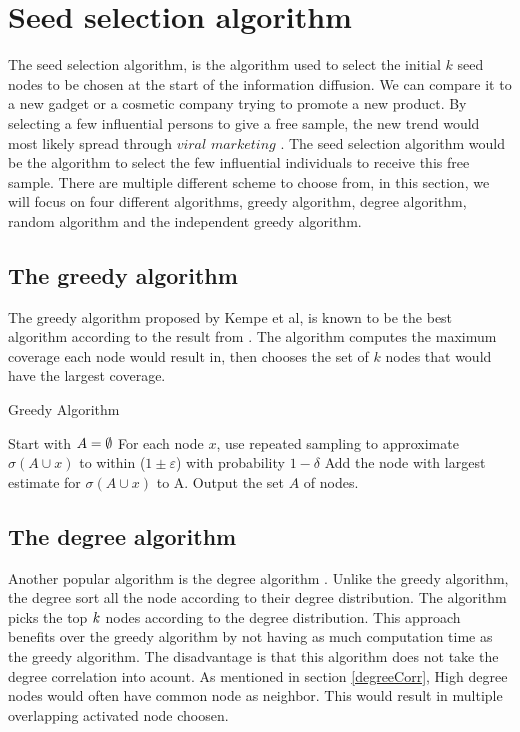 {\section{Seed selection algorithm}
The seed selection algorithm, is the algorithm used to select the initial $k$ seed nodes to be chosen at the start of the information diffusion. We can compare it to a new gadget or a cosmetic company trying to promote a new product. By selecting a few influential persons to give a free sample, the new trend would most likely  spread through $viral$ $marketing$ \cite{ViralMarketing}. The seed selection algorithm would be the algorithm to select the few influential individuals to receive this free sample. There are multiple different scheme to choose from, in this section, we will focus on four different algorithms, greedy algorithm, degree algorithm, random algorithm and the independent greedy algorithm.

\subsection{The greedy algorithm}
The greedy algorithm \cite{greedyInfluenc2005} proposed by Kempe et al, is known to be the best algorithm according to the result from  \cite{greedyInfluenc2005}. The algorithm computes the maximum coverage each node would result in, then chooses the set of $k$ nodes that would have the largest coverage.  

 \begin{algorithm}
\caption{Greedy Algorithm}
\begin{algorithmic}[1]
\State Start with $A = \emptyset$
\State For each node $x$, use repeated sampling to approximate $\sigma(A \cup {x}) $ to within ($1 \pm \varepsilon$) with probability
$1 − \delta$
\State Add the node with largest estimate for $\sigma(A \cup {x})$ to A.
\EndWhile
\State Output the set $A$ of nodes.
\end{algorithmic}
\end{algorithm}

\subsection{The degree algorithm}
Another popular algorithm is the degree algorithm \cite{greedyInfluenc2005}. Unlike the greedy algorithm, the degree sort all the node according to their degree distribution. The algorithm picks the top $\it{k}$ nodes according to the degree distribution. This approach benefits over the greedy algorithm by not having as much computation time as the greedy algorithm. The disadvantage is that this algorithm does not take the degree correlation into acount. As mentioned in section \ref{degreeCorr}, High degree nodes would often have common node as neighbor. This would result in multiple overlapping activated node choosen.

}
